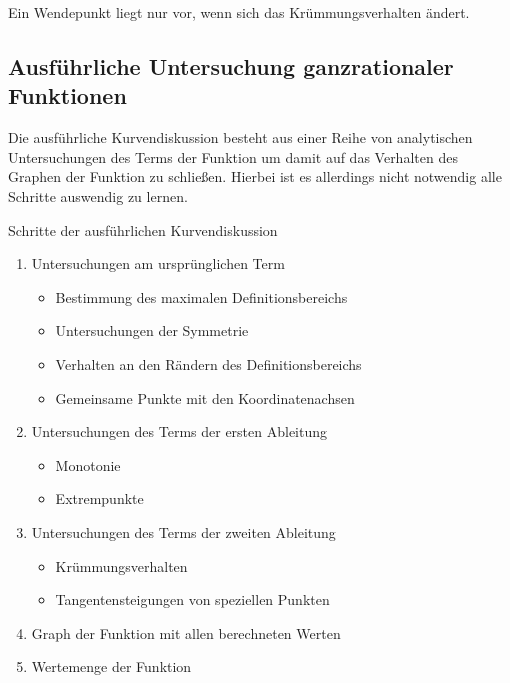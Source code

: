 \begin{b8d}{}{}
Ein Wendepunkt liegt nur vor, wenn sich das Krümmungsverhalten ändert.
\end{b8d}
\subsection{Ausführliche Untersuchung ganzrationaler Funktionen} 
Die ausführliche Kurvendiskussion besteht aus einer Reihe von analytischen Untersuchungen des Terms der Funktion um damit auf das Verhalten des Graphen der Funktion zu schließen. Hierbei ist es allerdings nicht notwendig alle Schritte auswendig zu lernen.
\begin{merke}{Schritte der ausführlichen Kurvendiskussion}{}
\begin{enumerate}
    \item Untersuchungen am ursprünglichen Term
    \begin{itemize}
        \item Bestimmung des maximalen Definitionsbereichs
        \item Untersuchungen der Symmetrie
        \item Verhalten an den Rändern des Definitionsbereichs 
        \item Gemeinsame Punkte mit den Koordinatenachsen
    \end{itemize}
    \item Untersuchungen des Terms der ersten Ableitung
        \begin{itemize}
            \item Monotonie
            \item Extrempunkte

        \end{itemize}
    \item Untersuchungen des Terms der zweiten Ableitung
        \begin{itemize}
            \item Krümmungsverhalten
            \item Tangentensteigungen von speziellen Punkten
        \end{itemize}
    \item Graph der Funktion mit allen berechneten Werten
    \item Wertemenge der Funktion
\end{enumerate}
\end{merke}

